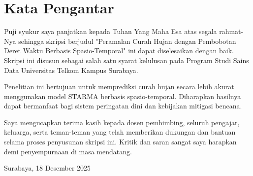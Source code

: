 \chapter*{Kata Pengantar}

Puji syukur saya panjatkan kepada Tuhan Yang Maha Esa atas segala rahmat-Nya sehingga skripsi berjudul "Peramalan Curah Hujan dengan Pembobotan Deret Waktu Berbasis Spasio-Temporal" ini dapat diselesaikan dengan baik. Skripsi ini disusun sebagai salah satu syarat kelulusan pada Program Studi Sains Data Universitas Telkom Kampus Surabaya.

Penelitian ini bertujuan untuk memprediksi curah hujan secara lebih akurat menggunakan model STARMA berbasis spasio-temporal. Diharapkan hasilnya dapat bermanfaat bagi sistem peringatan dini dan kebijakan mitigasi bencana.

Saya mengucapkan terima kasih kepada dosen pembimbing, seluruh pengajar, keluarga, serta teman-teman yang telah memberikan dukungan dan bantuan selama proses penyusunan skripsi ini. Kritik dan saran sangat saya harapkan demi penyempurnaan di masa mendatang.
  
\vspace{2cm}
\begin{flushright}
    {Surabaya, 18 Desember 2025}\\
    \Author
\end{flushright}